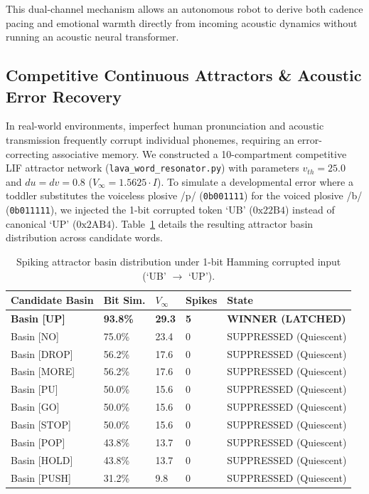 \documentclass[journal,twocolumn]{IEEEtran}
\begin{document}
This dual-channel mechanism allows an autonomous robot to derive both cadence pacing and emotional warmth directly from incoming acoustic dynamics without running an acoustic neural transformer.

\subsection{Competitive Continuous Attractors \& Acoustic Error Recovery}
In real-world environments, imperfect human pronunciation and acoustic transmission frequently corrupt individual phonemes, requiring an error-correcting associative memory. We constructed a 10-compartment competitive LIF attractor network (\texttt{lava\_word\_resonator.py}) with parameters $v_{th} = 25.0$ and $du = dv = 0.8$ ($V_\infty = 1.5625 \cdot I$). To simulate a developmental error where a toddler substitutes the voiceless plosive /p/ (\texttt{0b001111}) for the voiced plosive /b/ (\texttt{0b011111}), we injected the 1-bit corrupted token `UB' ($0\text{x}22\text{B}4$) instead of canonical `UP' ($0\text{x}2\text{AB}4$). Table~\ref{tab:attractors} details the resulting attractor basin distribution across candidate words.

\begin{table}[h]
\centering
\caption{Spiking attractor basin distribution under 1-bit Hamming corrupted input (`UB' $\to$ `UP').}
\label{tab:attractors}
\begin{tabular}{lllll}
\toprule
\textbf{Candidate Basin} & \textbf{Bit Sim.} & \textbf{$V_\infty$} & \textbf{Spikes} & \textbf{State} \\
\midrule
\textbf{Basin [UP]} & \textbf{93.8\%} & \textbf{29.3} & \textbf{5} & \textbf{WINNER (LATCHED)} \\
Basin [NO] & 75.0\% & 23.4 & 0 & SUPPRESSED (Quiescent) \\
Basin [DROP] & 56.2\% & 17.6 & 0 & SUPPRESSED (Quiescent) \\
Basin [MORE] & 56.2\% & 17.6 & 0 & SUPPRESSED (Quiescent) \\
Basin [PU] & 50.0\% & 15.6 & 0 & SUPPRESSED (Quiescent) \\
Basin [GO] & 50.0\% & 15.6 & 0 & SUPPRESSED (Quiescent) \\
Basin [STOP] & 50.0\% & 15.6 & 0 & SUPPRESSED (Quiescent) \\
Basin [POP] & 43.8\% & 13.7 & 0 & SUPPRESSED (Quiescent) \\
Basin [HOLD] & 43.8\% & 13.7 & 0 & SUPPRESSED (Quiescent) \\
Basin [PUSH] & 31.2\% & 9.8 & 0 & SUPPRESSED (Quiescent) \\
\bottomrule
\end{tabular}
\end{table}
\end{document}
